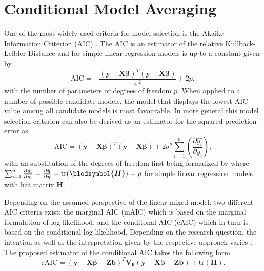 \section{Conditional Model Averaging}
\label{chap:3modelchoice}


One of the most widely used criteria for model selection is the Akaike Information Criterion (AIC) \citep{Akaike.1973}. 
The AIC is an estimator of the relative Kullback-Leibler-Distance \citep{Kullback.1951} and for simple linear regression models is up to a constant given by
\begin{equation*}
\label{aic}
\mathrm{AIC}= - \dfrac{(\boldsymbol y - \boldsymbol X \boldsymbol \beta)^{T} (\boldsymbol y - \boldsymbol X \boldsymbol \beta)}{\sigma^{2}} + 2  p,
\end{equation*} 
with the number of parameters or degrees of freedom $p$.
When applied to a number of possible candidate models, the model that displays the lowest AIC value among all candidate models is most favourable. In more general this model selection criterion can also be derived as an estimator for the squared prediction error \citep{efron2004estimation} as
\begin{equation*}
    \label{squaredpredictionerror}
    \mathrm{AIC} = (\boldsymbol y - \boldsymbol X \boldsymbol \beta)^{T} (\boldsymbol y - \boldsymbol X \boldsymbol \beta) + 2 \sigma^{2} \sum_{i=1}^{n}\left(\frac{\partial \hat{  {y_i}}}{\partial  {y_i}}\right),
\end{equation*}
with an substitution of the degrees of freedom first being formalized by \cite{stein1972bound} where $ \sum_{i=1}^{n}\frac{\partial \hat{  {y_i}}}{\partial  {y_i}} = \frac{\partial \hat{ \boldsymbol {y}}}{\partial  \boldsymbol {y}} = \mathrm{tr}(\blodsymbol{\boldsymbol{H}}) =\rho$ for simple linear regression models with hat matrix $\boldsymbol{H}$.

Depending on the assumed perspective of the linear mixed model, two different AIC criteria exist: the marginal AIC (mAIC) which is based on the marginal formulation of log-likelihood, and the conditonal AIC (cAIC) which in turn is based on the conditional log-likelihood. Depending on the research question, the intention as well as the interpretation given by the respective approach varies \citep{Vaida.2005, Greven.2010}.   
The proposed estimator of the conditional AIC takes the following form
\begin{equation*}
\label{cAIC}
\mathrm{cAIC}=(\boldsymbol y - \boldsymbol X \boldsymbol \beta - \boldsymbol Z \boldsymbol b)^{T} \boldsymbol{V_{\theta}} (\boldsymbol y - \boldsymbol X \boldsymbol \beta - \boldsymbol Z \boldsymbol b) + \mathrm{tr}(\boldsymbol H).
\end{equation*}


